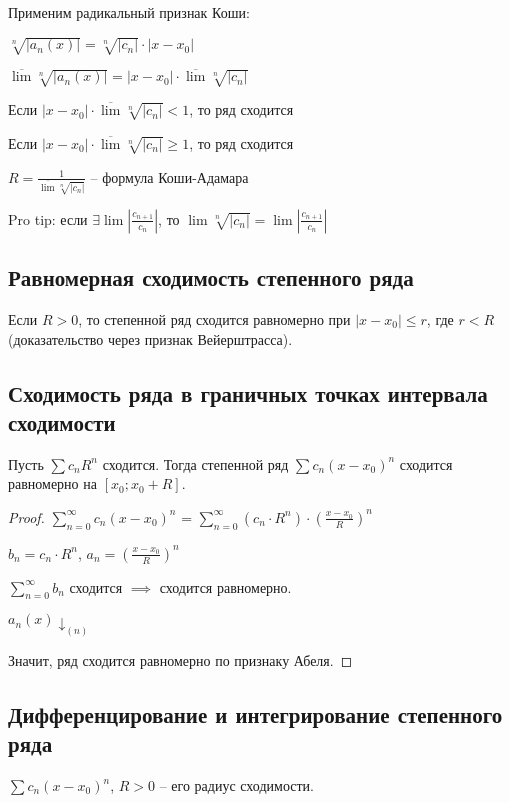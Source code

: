 Применим радикальный признак Коши:

$\sqrt[n]{|a_n(x)|} = \sqrt[n]{|c_n|} \cdot |x - x_0|$

$\overline{\lim}\sqrt[n]{|a_n(x)|} = |x - x_0| \cdot \overline{\lim}\sqrt[n]{|c_n|}$

Если $|x - x_0| \cdot \overline{\lim}\sqrt[n]{|c_n|} < 1$, то ряд сходится

Если $|x - x_0| \cdot \overline{\lim}\sqrt[n]{|c_n|} \geq 1$, то ряд сходится

$R = \frac{1}{\overline{\lim}\sqrt[n]{|c_n|}}$ -- формула Коши-Адамара

Pro tip: если $\exists \lim{\left|\frac{c_{n+1}}{c_n}\right|}$, то $\lim\sqrt[n]{|c_n|} = \lim\left|\frac{c_{n+1}}{c_n}\right|$

\subsection{Равномерная сходимость степенного ряда}

Если $R > 0$, то степенной ряд сходится равномерно при $|x - x_0| \leq r$, где $r < R$ (доказательство через признак Вейерштрасса).

\subsection{Сходимость ряда в граничных точках интервала сходимости}

Пусть $\sum c_n R^n$ сходится. Тогда степенной ряд $\sum c_n (x - x_0)^n$ сходится равномерно на $[x_0; x_0 + R]$.

\begin{proof}
$\sum_{n=0}^{\infty} c_n(x - x_0)^n$ =  $\sum_{n=0}^{\infty} (c_n \cdot R^n) \cdot \left(\frac{x - x_0}{R}\right)^n$

$b_n = c_n \cdot R^n$, $a_n = \left(\frac{x - x_0}{R}\right)^n$

$\sum_{n=0}^{\infty} b_n$ сходится $\implies$ сходится равномерно.

$a_n(x) \downarrow_{(n)}$

Значит, ряд сходится равномерно по признаку Абеля.
\end{proof}

\subsection{Дифференцирование и интегрирование степенного ряда}

$\sum c_n (x - x_0)^n$, $R > 0$ -- его радиус сходимости.

